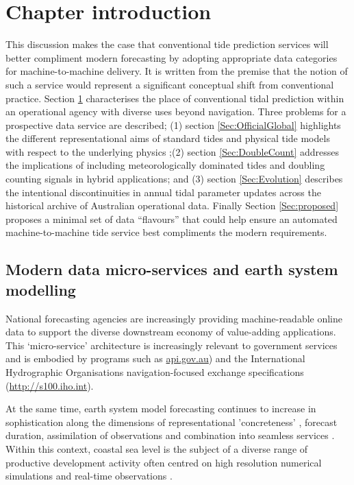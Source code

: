 \section{Chapter introduction}
\label{Sec:intro}
This discussion makes the case that conventional tide prediction services will better compliment modern forecasting by adopting appropriate data categories for machine-to-machine delivery.  It is written from the premise that the notion of such a service would represent a significant conceptual shift from conventional practice.  Section \ref{Sec:intro} characterises the place of conventional tidal prediction within an operational agency with diverse uses beyond navigation. Three problems for a prospective data service are described; (1) section \ref{Sec:OfficialGlobal} highlights the different representational aims of standard tides and physical tide models with respect to the underlying physics ;(2) section \ref{Sec:DoubleCount} addresses the implications of including meteorologically dominated tides and doubling counting signals in hybrid applications; and (3) section \ref{Sec:Evolution} describes the intentional discontinuities in annual tidal parameter updates across the historical archive of Australian operational data.   Finally Section \ref{Sec:proposed} proposes a minimal set of data ``flavours'' that could help ensure an automated machine-to-machine tide service best compliments the modern requirements. 


\subsection{Modern data micro-services and earth system modelling}
National forecasting agencies are increasingly providing machine-readable online data to support the diverse downstream economy of value-adding applications.
This `micro-service' architecture \citep{BCG2020} is increasingly relevant to government services and is embodied by programs such as  \url{api.gov.au}) and the International Hydrographic Organisations  navigation-focused exchange specifications (\url{http://s100.iho.int}).

 
At the same time, earth system model forecasting continues to increase in sophistication along the dimensions of representational 'concreteness' \citep{Petersen:2012kp}, forecast duration, assimilation of observations and combination into seamless services \cite{BOM2020}.
Within this context, coastal sea level is the subject of a diverse range of productive development activity often centred on high resolution numerical simulations and real-time observations \citep{10.3389/fmars.2019.00437}. 


